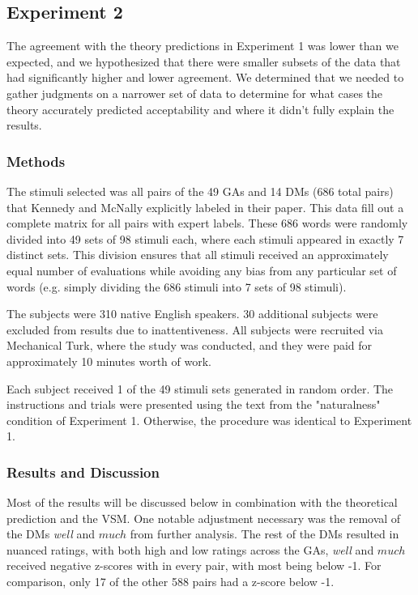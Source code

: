 \documentclass[11pt]{article}
\begin{document}
\subsection{Experiment 2}

The agreement with the theory predictions in Experiment 1 was lower than we expected, and we hypothesized that there were smaller subsets of the data that had significantly higher and lower agreement. We determined that we needed to gather judgments on a narrower set of data to determine for what cases the theory accurately predicted acceptability and where it didn't fully explain the results.

\subsubsection{Methods}
The stimuli selected was all pairs of the 49 GAs and 14 DMs (686 total pairs) that Kennedy and McNally explicitly labeled in their paper. This data fill out a complete matrix for all pairs with expert labels. These 686 words were randomly divided into 49 sets of 98 stimuli each, where each stimuli appeared in exactly 7 distinct sets. This division ensures that all stimuli received an approximately equal number of evaluations while avoiding any bias from any particular set of words (e.g. simply dividing the 686 stimuli into 7 sets of 98 stimuli).

The subjects were 310 native English speakers. 30 additional subjects were excluded from results due to inattentiveness. All subjects were recruited via Mechanical Turk, where the study was conducted, and they were paid for approximately 10 minutes worth of work.

Each subject received 1 of the 49 stimuli sets generated in random order. The instructions and trials were presented using the text from the "naturalness" condition of Experiment 1. Otherwise, the procedure was identical to Experiment 1.

\subsubsection{Results and Discussion}

Most of the results will be discussed below in combination with the theoretical prediction and the VSM. One notable adjustment necessary was the removal of the DMs \textit{well} and $much$ from further analysis. The rest of the DMs resulted in nuanced ratings, with both high and low ratings across the GAs, \textit{well} and $much$ received negative z-scores with in every pair, with most being below -1. For comparison, only 17 of the other 588 pairs had a z-score below -1.
\end{document}
